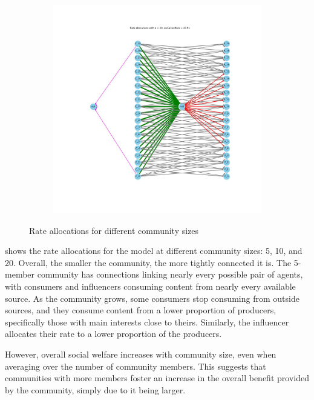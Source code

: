 \documentclass[11pt, letterpaper]{article}
\begin{document}
\begin{figure}[!h]
\begin{subfigure}[b]{0.4\textwidth}
    \end{subfigure}
    \begin{subfigure}[b]{0.65\textwidth}
        \includegraphics[width=\linewidth]{figures/n/20_allocs.jpg}
    \end{subfigure}
\caption{Rate allocations for different community sizes}
\label{fig:num_members_allocs}
\end{figure}

 shows the rate allocations for the model at different community sizes: 5, 10, and 20. Overall, the smaller the community, the more tightly connected it is. The 5-member community has connections linking nearly every possible pair of agents, with consumers and influencers consuming content from nearly every available source. As the community grows, some consumers stop consuming from outside sources, and they consume content from a lower proportion of producers, specifically those with main interests close to theirs. Similarly, the influencer allocates their rate to a lower proportion of the producers.

However, overall social welfare increases with community size, even when averaging over the number of community members. This suggests that communities with more members foster an increase in the overall benefit provided by the community, simply due to it being larger.
\end{document}
